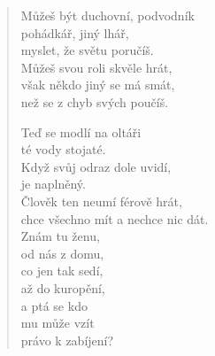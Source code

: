 \begin{verse}
 Můžeš být duchovní, podvodník \\
 pohádkář, jiný lhář, \\
 myslet, že světu poručíš. \\
 Můžeš svou roli skvěle hrát, \\
 však někdo jiný se má smát, \\
 než se z chyb svých poučíš.
 
 Teď se modlí na oltáři  \\
 té vody stojaté. \\
 Když svůj odraz dole uvidí, \\
 je naplněný. \\
 Člověk ten neumí férově hrát, \\
 chce všechno mít a nechce nic dát. \\
 Znám tu ženu, \\
 od nás z domu, \\
 co jen tak sedí, \\
 až do kuropění, \\
 a ptá se kdo  \\
 mu může vzít \\
 právo k zabíjení?
\end{verse}
